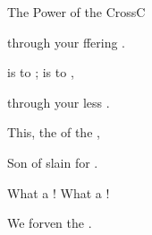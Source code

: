 \begin{song}{The Power of the Cross}{C}
\begin{SBExtraKeys}
{\begin{SBVerse}
         through your ffering 
              .

         is  to ;
             is  to ,

         through your less .

    \end{SBVerse}

    \begin{SBChorus}

        This, the  of the ,

        Son of  slain for .

        What a ! What a !

        We  forven  the . 
            \Ch{[Em}{}  \Ch{C]}{}

    \end{SBChorus}
}\end{SBExtraKeys}
\end{song}


